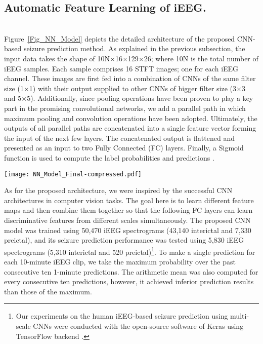 \documentclass[journal]{IEEEtran}
\begin{document}
\subsection{Automatic Feature Learning of iEEG.} ~\\


Figure~\ref{Fig_NN_Model} depicts the detailed architecture of the proposed CNN-based seizure prediction method. As explained in the previous subsection, the input data takes the shape of 10N$\times$16$\times$129$\times$26; where 10N is the total number of iEEG samples. Each sample comprises 16 STFT images; one for each iEEG channel. These images are first fed into a combination of CNNs of the same filter size (1$\times$1) with their output supplied to other CNNs of bigger filter size (3$\times$3 and 5$\times$5). Additionally, since pooling operations have been proven to play a key part in the promising convolutional networks, we add a parallel path in which maximum pooling and convolution operations have been adopted. Ultimately, the outputs of all parallel paths are concatenated into a single feature vector forming the input of the next few layers. The concatenated output is flattened and presented as an input to two Fully Connected (FC) layers. Finally, a Sigmoid function is used to compute the label probabilities and predictions \cite{Softmax}.

\begin{figure*}[!ht]
	\centering
	\texttt{[image: NN\_Model\_Final-compressed.pdf]}
	\caption{Schematic diagram of the proposed neural network architecture for epileptic seizure prediction: Each iEEG instance is of N$_{Ch}$$\times$129$\times$26 (N$_{Ch}$=16); Max Pooling stands for Maximum Pooling; FC layer stands for Fully Connected layer; $P_1$ and $P_2$ are the probabilities produced by the sigmoid function got class 1 and 2, respectively.}
	\label{Fig_NN_Model}
\end{figure*}

As for the proposed architecture, we were inspired by the successful CNN architectures in computer vision tasks. The goal here is to learn different feature maps and then combine them together so that the following FC layers can learn discriminative features from different scales simultaneously. The proposed CNN model was trained using 50,470 iEEG spectrograms (43,140 interictal and 7,330 preictal), and its seizure prediction performance was tested using 5,830 iEEG spectrograms (5,310 interictal and 520 preictal)\footnote[2]{Our experiments on the human iEEG-based seizure prediction using multi-scale CNNs were conducted with the open-source software of Keras using TensorFlow backend \cite{OurCodes}.}. To make a single prediction for each 10-minute iEEG clip, we take the maximum probability over the past consecutive ten 1-minute predictions. The arithmetic mean was also computed for every consecutive ten predictions, however, it achieved inferior prediction results than those of the maximum.    
\end{document}
